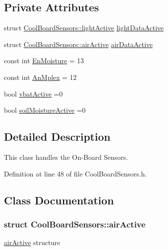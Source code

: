 \subsection*{Private Attributes}
\begin{DoxyCompactItemize}
\item 
struct \hyperlink{class_cool_board_sensors_df/da3/struct_cool_board_sensors_1_1light_active}{Cool\+Board\+Sensors\+::light\+Active} \hyperlink{class_cool_board_sensors_ac4deb1cf41bac8b91c780c92fab00ba4}{light\+Data\+Active}
\item 
struct \hyperlink{class_cool_board_sensors_d7/db6/struct_cool_board_sensors_1_1air_active}{Cool\+Board\+Sensors\+::air\+Active} \hyperlink{class_cool_board_sensors_abff8dfeccb2f7689847bb64d5f1cd31e}{air\+Data\+Active}
\item 
const int \hyperlink{class_cool_board_sensors_a6177d02e14a057a2f171a2e930b5038d}{En\+Moisture} = 13
\item 
const int \hyperlink{class_cool_board_sensors_a12ef28b1046219e0aee10bf64e28c4a5}{An\+Mplex} = 12
\item 
bool \hyperlink{class_cool_board_sensors_ab0b4bbae83796b52b90f91008d383583}{vbat\+Active} =0
\item 
bool \hyperlink{class_cool_board_sensors_ae7971bf527781ac4994309591b78ab89}{soil\+Moisture\+Active} =0
\end{DoxyCompactItemize}


\subsection{Detailed Description}
This class handles the On-\/\+Board Sensors. 

Definition at line 48 of file Cool\+Board\+Sensors.\+h.



\subsection{Class Documentation}
\label{struct_cool_board_sensors_1_1air_active}
\subsubsection{struct Cool\+Board\+Sensors\+:\+:air\+Active}
\hyperlink{class_cool_board_sensors_d7/db6/struct_cool_board_sensors_1_1air_active}{air\+Active} structure

